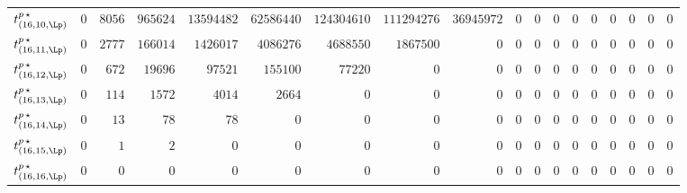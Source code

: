 \begin{tabular}{r|rrrrrrrrrrrrrrrrr}
  $t^{p \, \star}_{(16,10,\Lp)}$ & $0$ & $8056$ & $965624$ & $13594482$ & $62586440$ & $124304610$ & $111294276$ & $36945972$ & $0$ & $0$ & $0$ & $0$ & $0$ & $0$ & $0$ & $0$ & $0$ \\
  $t^{p \, \star}_{(16,11,\Lp)}$ & $0$ & $2777$ & $166014$ & $1426017$ & $4086276$ & $4688550$ & $1867500$ & $0$ & $0$ & $0$ & $0$ & $0$ & $0$ & $0$ & $0$ & $0$ & $0$ \\
  $t^{p \, \star}_{(16,12,\Lp)}$ & $0$ & $672$ & $19696$ & $97521$ & $155100$ & $77220$ & $0$ & $0$ & $0$ & $0$ & $0$ & $0$ & $0$ & $0$ & $0$ & $0$ & $0$ \\
  $t^{p \, \star}_{(16,13,\Lp)}$ & $0$ & $114$ & $1572$ & $4014$ & $2664$ & $0$ & $0$ & $0$ & $0$ & $0$ & $0$ & $0$ & $0$ & $0$ & $0$ & $0$ & $0$ \\
  $t^{p \, \star}_{(16,14,\Lp)}$ & $0$ & $13$ & $78$ & $78$ & $0$ & $0$ & $0$ & $0$ & $0$ & $0$ & $0$ & $0$ & $0$ & $0$ & $0$ & $0$ & $0$ \\
  $t^{p \, \star}_{(16,15,\Lp)}$ & $0$ & $1$ & $2$ & $0$ & $0$ & $0$ & $0$ & $0$ & $0$ & $0$ & $0$ & $0$ & $0$ & $0$ & $0$ & $0$ & $0$ \\
  $t^{p \, \star}_{(16,16,\Lp)}$ & $0$ & $0$ & $0$ & $0$ & $0$ & $0$ & $0$ & $0$ & $0$ & $0$ & $0$ & $0$ & $0$ & $0$ & $0$ & $0$ & $0$ \\
\end{tabular}
